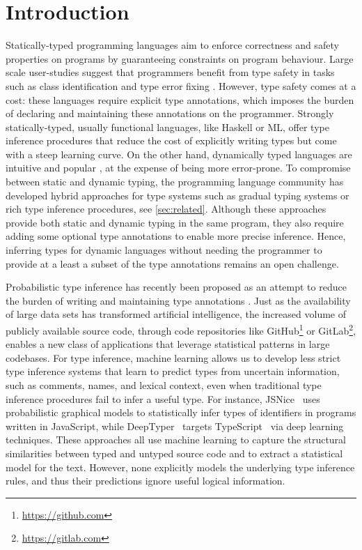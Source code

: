 \documentclass[sigplan,10pt,anonymous]{acmart} %
\theoremstyle{plain}
\theoremstyle{remark}
\theoremstyle{definition}
\begin{document}
\section{Introduction}
Statically-typed programming languages aim to enforce correctness and safety  properties
on programs by guaranteeing constraints on program behaviour.
Large scale user-studies
suggest that programmers
benefit from type safety in tasks
such as class identification and type error fixing  \citep{hanenberg14}.
However, type safety comes at a cost: these languages require explicit type annotations,
which imposes the burden of declaring and maintaining these annotations on the programmer.
Strongly statically-typed, usually functional languages, like Haskell or ML,
offer type inference procedures that reduce
the cost of explicitly writing types but come with
a steep learning curve.
On the other hand, dynamically typed languages are intuitive
and popular \cite{meyerovich12}, at the expense of being more error-prone.
To compromise between static and dynamic typing,
the programming language community has developed hybrid approaches for type systems
such as gradual typing systems \cite{siek06} or rich type inference procedures, see \cref{sec:related}.
Although these approaches provide both static and dynamic typing in the same program,
they also require adding some optional type annotations to enable more precise inference.
Hence, inferring types for dynamic
languages without needing the programmer to provide at a least a subset of
the type annotations remains an open challenge.

Probabilistic type inference
has recently been proposed as an attempt to reduce the burden
of writing and maintaining type
annotations \cite{raychev15,xu16,hellendoorn18}.
Just as the availability of large data sets has transformed artificial intelligence,
the increased volume of publicly available source code, through
code repositories like GitHub\footnote{\href{https://github.com}{https://github.com}}
or GitLab\footnote{\href{https://gitlab.com}{https://gitlab.com}},
enables a new class of applications that leverage statistical
patterns in large codebases.
For type inference, machine learning
allows us to develop less strict type inference systems
that learn to predict types from uncertain information,
such as comments, names, and lexical context,
even when traditional type inference procedures
fail to infer a useful type.
For instance,
JSNice~\cite{raychev15} uses probabilistic graphical models to statistically infer types of identifiers in programs written in JavaScript, while DeepTyper~\cite{hellendoorn18} targets TypeScript~\cite{typescript} via deep learning techniques.
These approaches all use machine learning to capture the structural
similarities between typed and untyped source code and to extract a statistical model for
the text. However, none explicitly models the underlying
type inference rules, and thus their predictions ignore useful logical information.
\end{document}
